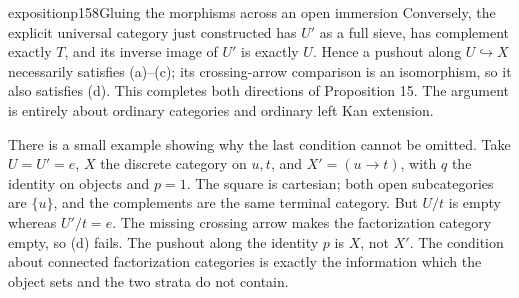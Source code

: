 \begin{dcomment}{exposition}{p158}{Gluing the morphisms across an open immersion}
Conversely, the explicit universal category just constructed has $U'$ as a full sieve, has complement exactly $T$, and its inverse image of $U'$ is exactly $U$. Hence a pushout along $U\hookrightarrow X$ necessarily satisfies (a)--(c); its crossing-arrow comparison is an isomorphism, so it also satisfies (d). This completes both directions of Proposition 15. The argument is entirely about ordinary categories and ordinary left Kan extension.

There is a small example showing why the last condition cannot be omitted. Take $U=U'=e$, $X$ the discrete category on $u,t$, and $X'=(u\to t)$, with $q$ the identity on objects and $p=1$. The square is cartesian; both open subcategories are $\{u\}$, and the complements are the same terminal category. But $U/t$ is empty whereas $U'/t=e$. The missing crossing arrow makes the factorization category empty, so (d) fails. The pushout along the identity $p$ is $X$, not $X'$. The condition about connected factorization categories is exactly the information which the object sets and the two strata do not contain.
\end{dcomment}

